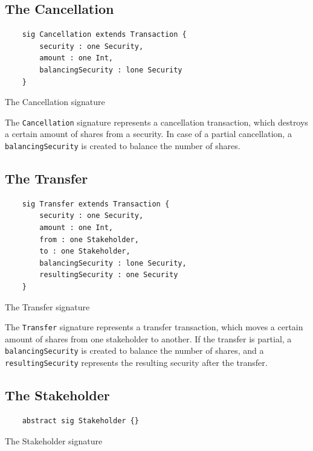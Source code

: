 \subsection{The Cancellation}
\begin{listing}[!h]
\begin{verbatim}
	sig Cancellation extends Transaction {
		security : one Security,
		amount : one Int,
		balancingSecurity : lone Security
	}
\end{verbatim}
\caption{The Cancellation signature}
\label{lst:cancellation-sig-1}
\end{listing}

The \texttt{Cancellation} signature represents a cancellation transaction, which destroys a certain amount of shares from a security. In case of a partial cancellation, a \texttt{balancingSecurity} is created to balance the number of shares.

\subsection{The Transfer}
\begin{listing}[!h]
\begin{verbatim}
	sig Transfer extends Transaction {
		security : one Security,
		amount : one Int,
		from : one Stakeholder,
		to : one Stakeholder,
		balancingSecurity : lone Security,
		resultingSecurity : one Security
	}
\end{verbatim}
\caption{The Transfer signature}
\label{lst:transfer-sig-1}
\end{listing}

The \texttt{Transfer} signature represents a transfer transaction, which moves a certain amount of shares from one stakeholder to another. If the transfer is partial, a \texttt{balancingSecurity} is created to balance the number of shares, and a \texttt{resultingSecurity} represents the resulting security after the transfer.

\subsection{The Stakeholder}
\begin{listing}[!h]
\begin{verbatim}
	abstract sig Stakeholder {}
\end{verbatim}
\caption{The Stakeholder signature}
\label{lst:stakeholder-sig-1}
\end{listing}

